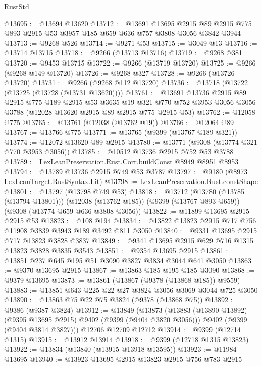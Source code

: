\begin{lexlean}{RustStd}
\begin{coremodule}
@13695 := @13694 @13620
@13712 := @13691
    @13695
    @2915
    @89
    @2915
    @775
    @893
    @2915
    @53
    @3957
    @185
    @659
    @636
    @757
    @3808
    @3056
    @3842
    @3944
@13713 := @9268 @526
@13714 := @9271 @53
@13715 := @3049 @13
@13716 := @13714 @13715
@13718 := @9266 (@13713 @13716)
@13719 := @9268 @381
@13720 := @9453 @13715
@13722 := @9266 (@13719 @13720)
@13725 := @9266 (@9268 @149 @13720)
@13726 := @9268 @327
@13728 := @9266 (@13726 @13720)
@13731 := @9266 (@9268 @112 @13720)
@13736 := @13718 (@13722 (@13725 (@13728 (@13731 @13620))))
@13761 := @13691
    @13736
    @2915
    @89
    @2915
    @775
    @189
    @2915
    @53
    @3635
    @19
    @321
    @770
    @752
    @3953
    @3056
    @3056
    @3788
    (@12028 @13620 @2915 @89 @2915 @775 @2915 @53)
@13762 := @12058 @775
@13765 := @13761 (@12038 (@13762 @19))
@13766 := @12064 @89
@13767 := @13766 @775
@13771 := @13765 (@9399 (@13767 @189 @321))
@13774 := @12072 @13620 @89 @2915
@13780 := @13771 (@9308 (@13774 @321 @770 @3953 @3056))
@13785 := @10512 @13736 @2915 @752 @53 @3788
@13789 := LexLeanPreservation.Rust.Corr.buildConst @8949 @8951 @8953
@13794 := @13789 @13736 @2915 @749 @53 @3787
@13797 := @9180 (@8973 LexLeanTarget.RustSyntax.Lit)
@13798 := LexLeanPreservation.Rust.constShape
@13801 := @13797 (@13798 @749 @53)
@13818 := @13712
    (@13780 (@13785 (@13794 @13801)))
    (@12038 (@13762 @185))
    (@9399 (@13767 @893 @659))
    (@9308 (@13774 @659 @636 @3808 @3056))
@13822 := @11899 @13695 @2915 @2915 @53
@13823 := @108 @194
@13834 := @13822 @13823 @2915 @717 @756 @11908 @3839 @3943 @189 @3492 @811 @3050
@13840 := @9331 @13695 @2915 @717 @13823 @3828 @3837
@13849 := @9341 @13695 @2915 @629 @716 @1315 @13823 @3828 @3835 @3543
@13851 := @9354 @13695 @2915
@13861 := @13851 @237 @645 @195 @51 @3090 @3827 @3834 @3044 @641 @3050
@13863 := @9370 @13695 @2915
@13867 := @13863 @185 @195 @185 @3090
@13868 := @9379 @13695
@13873 := @13861 (@13867 (@9378 (@13868 @185)) @9559)
@13883 := @13851 @643 @225 @22 @27 @3824 @3056 @3069 @3044 @725 @3050
@13890 := @13863 @75 @22 @75 @3824 (@9378 (@13868 @75))
@13892 := @9386 (@9387 @3824)
@13912 := @13849
    (@13873
      (@13883 (@13890 @13892) (@9395 @13695 @2915) @9402 (@9399 (@9404 @3820 @3056)))
      @9402
      (@9399 (@9404 @3814 @3827)))
    @12706
    @12709
    @12712
@13914 := @9399 (@12714 @1315)
@13915 := @13912 @13914
@13918 := @9399 (@12718 @1315 @13823)
@13922 := @13834 (@13840 (@13915 @13918 @13595))
@13923 := @11984 @13695
@13940 := @13923
    @13695
    @2915
    @13823
    @2915
    @756
    @783
    @2915

\end{coremodule}
\end{lexlean}
